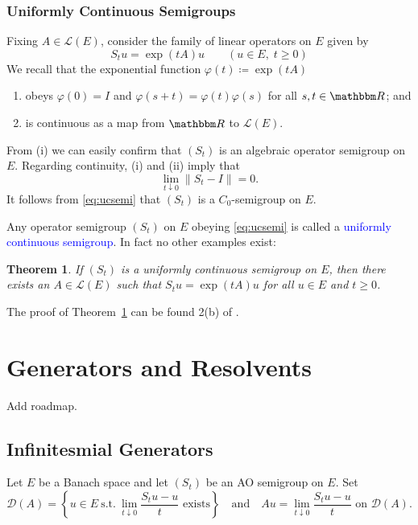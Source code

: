 \documentclass[12pt, reqno]{amsart}
\renewcommand{\geq}{\geqslant}
\newcommand{\st}{\ensuremath{\ \mathrm{s.t.}\ }}
\newcommand{\1}{\mathbbm 1}
\newcommand{\lL}{\mathcal L}
\newcommand{\dD}{\mathcal D}
\newcommand{\RR}{\mathbbm R}
\renewcommand{\phi}{\varphi}
\theoremstyle{plain}
\newtheorem{theorem}{Theorem}[section]
\theoremstyle{definition}
\newcommand{\navy}[1]{\textcolor{blue}{#1}}
\begin{document}
\subsubsection{Uniformly Continuous Semigroups}\label{ss:ucsemi}

Fixing $A \in \lL(E)$, consider the family of linear operators on $E$ given
by 
%
\begin{equation*}
    S_t u = \exp(t A) u
    \qquad (u \in E, \; t \geq 0)
\end{equation*}
%
We recall that the exponential function $\phi(t) \coloneq \exp(t A)$ 
%
\begin{enumerate}
    \item obeys $\phi(0) = I$ and $\phi(s + t) = \phi(t) \phi(s)$ for all $s, t
        \in \RR$; and
    \item is continuous as a map from $\RR$ to $\lL(E)$.
\end{enumerate}
%
From (i) we can easily confirm that $(S_t)$ is an algebraic operator semigroup
on $E$.  Regarding continuity, (i) and (ii) imply that
%
\begin{equation}\label{eq:ucsemi}
    \lim_{t \downarrow 0} \| S_t - I \| = 0.
\end{equation}
%
It follows from \eqref{eq:ucsemi} that $(S_t)$ is a $C_0$-semigroup on $E$.

Any operator semigroup $(S_t)$ on $E$ obeying \eqref{eq:ucsemi} is called a
\navy{uniformly continuous semigroup}.  In fact no other examples exist:

\begin{theorem}\label{t:ucsemi}
    If $(S_t)$ is a uniformly continuous semigroup on $E$, then there exists an
    $A \in \lL(E)$ such that $S_t u = \exp(t A) u$ for all $u \in E$ and $t \geq 0$.
\end{theorem}

The proof of Theorem~\ref{t:ucsemi} can be found 2(b) of \cite{engel2006short}.


\section{Generators and Resolvents}

Add roadmap.


\subsection{Infinitesmial Generators}

Let $E$ be a Banach space and let $(S_t)$ be an AO semigroup on $E$.  Set
%
\begin{equation*}
    \dD(A) =
    \left\{
        u \in E \st 
        \lim_{t \downarrow 0} \frac{S_t u - u}{t} \text{ exists}
    \right\}
    \quad \text{and} \quad
       Au = \lim_{t \downarrow 0} \frac{S_t u - u}{t} \text{ on }
       \dD(A).
\end{equation*}
\end{document}
